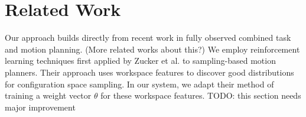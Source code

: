 \section{Related Work}
Our approach builds directly from recent work in fully observed combined
task and motion planning. (More related works about this?)
We employ reinforcement learning techniques first applied by Zucker et al.
to sampling-based motion planners. Their approach uses workspace features to
discover good distributions for configuration space sampling. In our system,
we adapt their method of training a weight vector $\theta$ for these workspace features.
TODO: this section needs major improvement